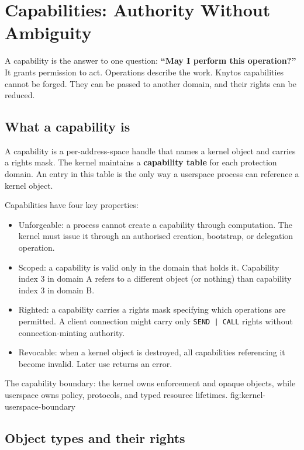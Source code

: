 \chapter{Capabilities: Authority Without Ambiguity}
\label{chap:capabilities}

A capability is the answer to one question: \textbf{``May I perform this
operation?''} It grants permission to act. Operations describe the work.
Knytos capabilities cannot be forged. They can be passed to another domain,
and their rights can be reduced.

\section{What a capability is}

A capability is a per-address-space handle that names a kernel object and carries
a rights mask. The kernel maintains a \textbf{capability table} for each protection
domain. An entry in this table is the only way a userspace process can reference a
kernel object.

Capabilities have four key properties:

\begin{itemize}
    \item Unforgeable: a process cannot create a capability through
        computation. The kernel must issue it through an authorised creation,
        bootstrap, or delegation operation.
    \item Scoped: a capability is valid only in the domain that holds it.
        Capability index 3 in domain A refers to a different object (or nothing)
        than capability index 3 in domain B.
    \item Righted: a capability carries a rights mask specifying which
        operations are permitted. A client connection might carry only
        \texttt{SEND | CALL} rights without connection-minting authority.
    \item Revocable: when a kernel object is destroyed, all capabilities
        referencing it become invalid. Later use returns an error.
\end{itemize}

    {The capability boundary: the kernel owns enforcement and opaque objects, while
    userspace owns policy, protocols, and typed resource lifetimes.}
    {fig:kernel-userspace-boundary}

\section{Object types and their rights}

